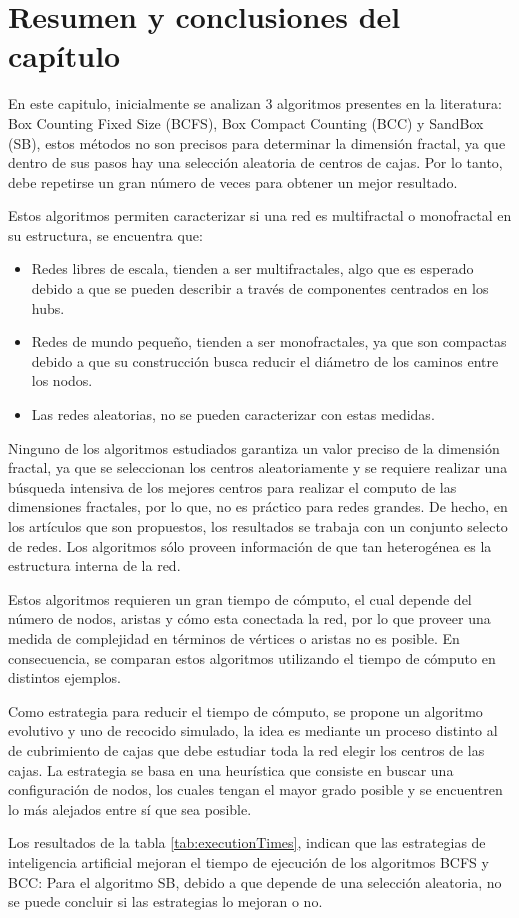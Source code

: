 \newpage
\section{Resumen y conclusiones del capítulo}

En este capitulo, inicialmente se analizan 3 algoritmos presentes en la literatura: Box Counting Fixed Size (BCFS), Box Compact Counting (BCC) y SandBox (SB), estos métodos no son precisos para determinar la dimensión fractal, ya que dentro de sus pasos hay una selección aleatoria de centros de cajas. Por lo tanto, debe repetirse un gran número de veces para obtener un mejor resultado.

Estos algoritmos permiten caracterizar si una red es multifractal o monofractal en su estructura, se encuentra que:

\begin{itemize}
    \item Redes libres de escala, tienden a ser multifractales, algo que es esperado debido a que se pueden describir a través de componentes centrados en los hubs.
    \item Redes de mundo pequeño,  tienden a ser monofractales, ya que son compactas debido a que su construcción busca reducir el diámetro de los caminos entre los nodos.
    \item Las redes aleatorias, no se pueden caracterizar con estas medidas.
\end{itemize}

Ninguno de los algoritmos estudiados garantiza un valor preciso de la dimensión fractal, ya que se seleccionan los centros aleatoriamente y se requiere realizar una búsqueda intensiva de los mejores centros para realizar el computo de las dimensiones fractales, por lo que, no es práctico para redes grandes. De hecho, en los artículos que son propuestos, los resultados se trabaja con un conjunto selecto de redes. Los algoritmos sólo proveen información de que tan heterogénea es la estructura interna de la red.

Estos algoritmos requieren un gran tiempo de cómputo, el cual depende del número de nodos, aristas y cómo esta conectada la red, por lo que proveer una medida de complejidad en términos de vértices o aristas no es posible. En consecuencia, se comparan estos algoritmos utilizando el tiempo de cómputo en distintos ejemplos.

Como estrategia para reducir el tiempo de cómputo, se propone un algoritmo evolutivo y uno de recocido simulado, la idea es mediante un proceso distinto al de cubrimiento de cajas que debe estudiar toda la red elegir los centros de las cajas. La estrategia se basa en una heurística que consiste en buscar una configuración de nodos, los cuales tengan el mayor grado posible y se encuentren lo más alejados entre sí que sea posible.

Los resultados de la tabla \ref{tab:executionTimes}, indican que las estrategias de inteligencia artificial mejoran el tiempo de ejecución de los algoritmos BCFS y BCC: Para el algoritmo SB, debido a que depende de una selección aleatoria, no se puede concluir si las estrategias lo mejoran o no.